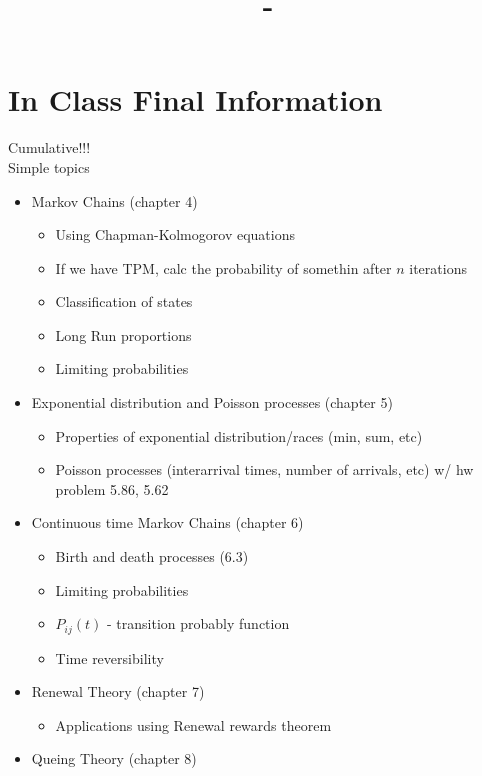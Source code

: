 \documentclass[answers,12pt,addpoints]{exam}
\author{\name}
\title{\course \ - \assignment}
\begin{document}
\maketitle


\newpage
\section*{In Class Final Information}
Cumulative!!!\\
Simple topics\\
\begin{itemize}
    \item Markov Chains (chapter 4)
    \begin{itemize}
        \item Using Chapman-Kolmogorov equations
        \item If we have TPM, calc the probability of somethin after $n$ iterations
        \item Classification of states
        \item Long Run proportions
        \item Limiting probabilities
    \end{itemize}
    \item Exponential distribution and Poisson processes (chapter 5)
    \begin{itemize}
        \item Properties of exponential distribution/races (min, sum, etc)
        \item Poisson processes (interarrival times, number of arrivals, etc) w/ hw problem 5.86, 5.62
    \end{itemize}
    \item Continuous time Markov Chains (chapter 6)
    \begin{itemize}
        \item Birth and death processes (6.3)
        \item Limiting probabilities 
        \item $P_{ij}(t)$ - transition probably function
        \item Time reversibility
    \end{itemize}
    \item Renewal Theory (chapter 7)
    \begin{itemize}
        \item Applications using Renewal rewards theorem
    \end{itemize}
    \item Queing Theory (chapter 8)

\end{itemize}
\end{document}
